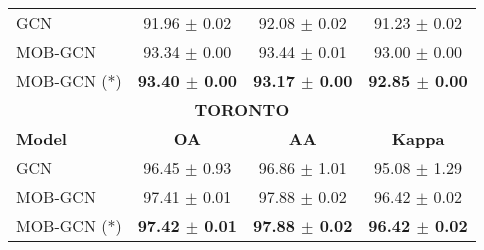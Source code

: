 \begin{table}
\begin{tabular}{|lccc|}
\hline
GCN & 91.96 $\pm$ 0.02 & 92.08 $\pm$ 0.02 & 91.23 $\pm$ 0.02 \\
MOB-GCN & 93.34 $\pm$ 0.00 & 93.44 $\pm$ 0.01 & 93.00 $\pm$ 0.00 \\
MOB-GCN (*) & \textbf{93.40 $\pm$ 0.00} & \textbf{93.17 $\pm$ 0.00} & \textbf{92.85 $\pm$ 0.00} \\
\hline
\multicolumn{4}{|c|}{\textbf{TORONTO}} \\
\hline
\textbf{Model} & \textbf{OA} & \textbf{AA} & \textbf{Kappa} \\
\hline
GCN & 96.45 $\pm$ 0.93 & 96.86 $\pm$ 1.01 & 95.08 $\pm$ 1.29 \\
MOB-GCN & 97.41 $\pm$ 0.01 & 97.88 $\pm$ 0.02 & 96.42 $\pm$ 0.02 \\
MOB-GCN (*) & \textbf{97.42 $\pm$ 0.01} & \textbf{97.88 $\pm$ 0.02} & \textbf{96.42 $\pm$ 0.02} \\
\hline
\end{tabular}
\label{table:5_percent_results}
\end{table}





